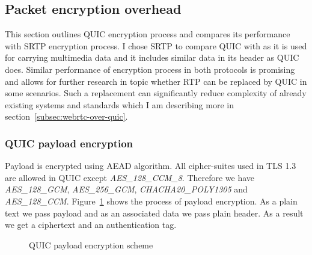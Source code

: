 \clearpage

\subsection{Packet encryption overhead}
\label{subsec:packet-encryption-overhead}
This section outlines QUIC encryption process and compares its performance with SRTP encryption process.
I chose SRTP to compare QUIC with as it is used for carrying multimedia data and it includes similar data in its
header as QUIC does.
Similar performance of encryption process in both protocols is promising and allows for further research in topic
whether RTP can be replaced by QUIC in some scenarios.
Such a replacement can significantly reduce complexity of already existing systems and standards which I am describing
more in section~\ref{subsec:webrtc-over-quic}.

\subsubsection{QUIC payload encryption}
Payload is encrypted using AEAD algorithm.
All cipher-suites used in TLS 1.3 are allowed in QUIC except \textit{AES\_128\_CCM\_8}.
Therefore we have \textit{AES\_128\_GCM}, \textit{AES\_256\_GCM}, \textit{CHACHA20\_POLY1305} and \textit{AES\_128\_CCM}.
Figure~\ref{fig:payload_enc} shows the process of payload encryption.
As a plain text we pass payload and as an associated data we pass plain header.
As a result we get a ciphertext and an authentication tag.

\begin{figure}[h]
    \centering
    \caption{QUIC payload encryption scheme}
    \label{fig:payload_enc}
\end{figure}

